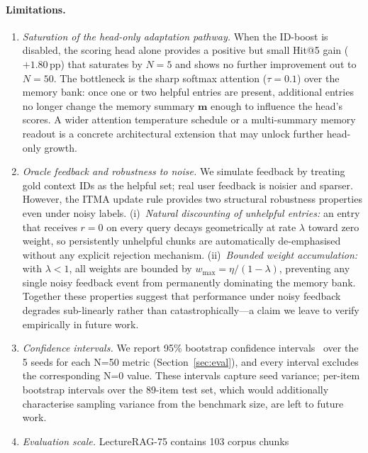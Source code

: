 \documentclass[preprint,12pt]{elsarticle}
\begin{document}
\paragraph{Limitations.}
\begin{enumerate}
  \item \emph{Saturation of the head-only adaptation pathway.}  When the
        ID-boost is disabled, the scoring head alone provides a positive but
        small Hit@5 gain ($+1.80$\,pp) that saturates by $N{=}5$ and shows
        no further improvement out to $N{=}50$.  The bottleneck is the
        sharp softmax attention ($\tau{=}0.1$) over the memory bank: once one
        or two helpful entries are present, additional entries no longer
        change the memory summary $\mathbf{m}$ enough to influence the head's
        scores.  A wider attention temperature schedule or a multi-summary
        memory readout is a concrete architectural extension that may unlock
        further head-only growth.
  \item \emph{Oracle feedback and robustness to noise.}  We simulate feedback
        by treating gold context IDs as the helpful set; real user feedback is
        noisier and sparser.  However, the ITMA update rule provides two
        structural robustness properties even under noisy labels.
        (i)~\emph{Natural discounting of unhelpful entries:} an entry that
        receives $r=0$ on every query decays geometrically at rate $\lambda$
        toward zero weight, so persistently unhelpful chunks are automatically
        de-emphasised without any explicit rejection mechanism.
        (ii)~\emph{Bounded weight accumulation:} with $\lambda{<}1$, all
        weights are bounded by $w_{\max}{=}\eta/(1-\lambda)$, preventing any
        single noisy feedback event from permanently dominating the memory bank.
        Together these properties suggest that performance under noisy feedback
        degrades sub-linearly rather than catastrophically---a claim we leave
        to verify empirically in future work.
  \item \emph{Confidence intervals.}  We report 95\% bootstrap confidence
        intervals~\citep{efron1993bootstrap} over the 5 seeds for each N=50
        metric (Section~\ref{sec:eval}), and every interval excludes the
        corresponding N=0 value.  These intervals capture seed variance;
        per-item bootstrap intervals over the 89-item test set, which would
        additionally characterise sampling variance from the benchmark size,
        are left to future work.
  \item \emph{Evaluation scale.}  LectureRAG-75 contains 103 corpus chunks

\end{enumerate}
\end{document}
